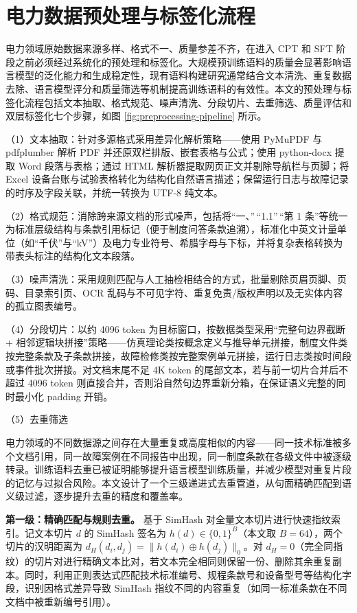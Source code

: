 \documentclass[fontset=fandol,type=master,campus=shenzhen,etitleauto=true]{hithesisbook}
\begin{document}
\section{电力数据预处理与标签化流程}\label{sec:preprocess}

电力领域原始数据来源多样、格式不一、质量参差不齐，在进入 CPT 和 SFT 阶段之前必须经过系统化的预处理和标签化。大规模预训练语料的质量会显著影响语言模型的泛化能力和生成稳定性，现有语料构建研究通常结合文本清洗、重复数据去除、语言模型评分和质量筛选等机制提高训练语料的有效性\cite{ref56,ref57,ref58}。本文的预处理与标签化流程包括文本抽取、格式规范、噪声清洗、分段切片、去重筛选、质量评估和双层标签化七个步骤，如图 \ref{fig:preprocessing-pipeline} 所示。

\noindent （1）文本抽取：针对多源格式采用差异化解析策略——使用 PyMuPDF 与 pdfplumber 解析 PDF 并还原双栏排版、嵌套表格与公式；使用 python-docx 提取 Word 段落与表格；通过 HTML 解析器提取网页正文并剔除导航栏与页脚；将 Excel 设备台账与试验表格转化为结构化自然语言描述；保留运行日志与故障记录的时序及字段关联，并统一转换为 UTF-8 纯文本。

\noindent （2）格式规范：消除跨来源文档的形式噪声，包括将``一、''\,``1.1''\,``第 1 条''等统一为标准层级结构与条款引用标记（便于制度问答条款追溯），标准化中英文计量单位（如``千伏''与``kV''）及电力专业符号、希腊字母与下标，并将复杂表格转换为带表头标注的结构化文本段落。

\noindent （3）噪声清洗：采用规则匹配与人工抽检相结合的方式，批量剔除页眉页脚、页码、目录索引页、OCR 乱码与不可见字符、重复免责/版权声明以及无实体内容的孤立图表编号。

\noindent （4）分段切片：以约 4096 token 为目标窗口，按数据类型采用``完整句边界截断 + 相邻逻辑块拼接''策略——仿真理论类按概念定义与推导单元拼接，制度文件类按完整条款及子条款拼接，故障检修类按完整案例单元拼接，运行日志类按时间段或事件批次拼接。对文档末尾不足 4K token 的尾部文本，若与前一切片合并后不超过 4096 token 则直接合并，否则沿自然句边界重新分箱，在保证语义完整的同时最小化 padding 开销。

\noindent （5）去重筛选

电力领域的不同数据源之间存在大量重复或高度相似的内容------同一技术标准被多个文档引用，同一故障案例在不同报告中出现，同一制度条款在各级文件中被逐级转录。训练语料去重已被证明能够提升语言模型训练质量，并减少模型对重复片段的记忆与过拟合风险\cite{ref57}。本文设计了一个三级递进式去重管道，从句面精确匹配到语义级过滤，逐步提升去重的精度和覆盖率。

\textbf{第一级：精确匹配与规则去重。} 基于 SimHash 对全量文本切片进行快速指纹索引\cite{ref59,ref60}。记文本切片 $d$ 的 SimHash 签名为 $h(d) \in \{0,1\}^{B}$（本文取 $B = 64$），两个切片的汉明距离为 $d_H(d_i, d_j) = \|h(d_i) \oplus h(d_j)\|_0$。对 $d_H = 0$（完全同指纹）的切片对进行精确文本比对，若文本完全相同则保留一份、删除其余重复副本。同时，利用正则表达式匹配技术标准编号、规程条款号和设备型号等结构化字段，识别因格式差异导致 SimHash 指纹不同的内容重复（如同一标准条款在不同文档中被重新编号引用）。
\end{document}
